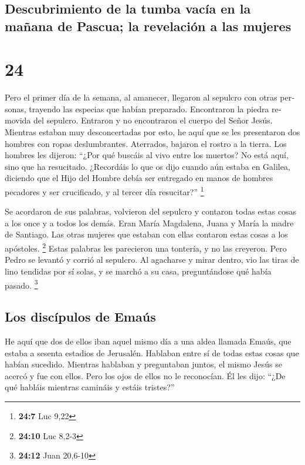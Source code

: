 \begin{paracol}{2}
\begin{otherlanguage}{english}
{\subsection{Descubrimiento de la tumba vacía en la mañana de Pascua; la
revelación a las
mujeres}\label{descubrimiento-de-la-tumba-vacuxeda-en-la-mauxf1ana-de-pascua-la-revelaciuxf3n-a-las-mujeres}}

\hypertarget{section-29}{%
\section{24}\label{section-29}}

 Pero el primer día de la semana, al amanecer, llegaron al
sepulcro con otras personas, trayendo las especias que habían preparado.
 Encontraron la piedra removida del sepulcro.
 Entraron y no encontraron el cuerpo del Señor Jesús.
 Mientras estaban muy desconcertadas por esto, he aquí que
se les presentaron dos hombres con ropas deslumbrantes. 
Aterrados, bajaron el rostro a la tierra. Los hombres les dijeron:
``¿Por qué buscáis al vivo entre los muertos?  No está
aquí, sino que ha resucitado. ¿Recordáis lo que os dijo cuando aún
estaba en Galilea,  diciendo que el Hijo del Hombre debía
ser entregado en manos de hombres pecadores y ser crucificado, y al
tercer día resucitar?'' \footnote{\textbf{24:7} Luc 9,22}

 Se acordaron de sus palabras,  volvieron
del sepulcro y contaron todas estas cosas a los once y a todos los
demás.  Eran María Magdalena, Juana y María la madre de
Santiago. Las otras mujeres que estaban con ellas contaron estas cosas a
los apóstoles. \footnote{\textbf{24:10} Luc 8,2-3}  Estas
palabras les parecieron una tontería, y no las creyeron. 
Pero Pedro se levantó y corrió al sepulcro. Al agacharse y mirar dentro,
vio las tiras de lino tendidas por sí solas, y se marchó a su casa,
preguntándose qué había pasado. \footnote{\textbf{24:12} Juan 20,6-10}

\hypertarget{los-discuxedpulos-de-emauxfas}{%
\subsection{Los discípulos de
Emaús}\label{los-discuxedpulos-de-emauxfas}}

 He aquí que dos de ellos iban aquel mismo día a una
aldea llamada Emaús, que estaba a sesenta estadios de Jerusalén.
 Hablaban entre sí de todas estas cosas que habían
sucedido.  Mientras hablaban y preguntaban juntos, el
mismo Jesús se acercó y fue con ellos.  Pero los ojos de
ellos no le reconocían.  Él les dijo: ``¿De qué habláis
mientras camináis y estáis tristes?''


\end{otherlanguage}
\end{paracol}
